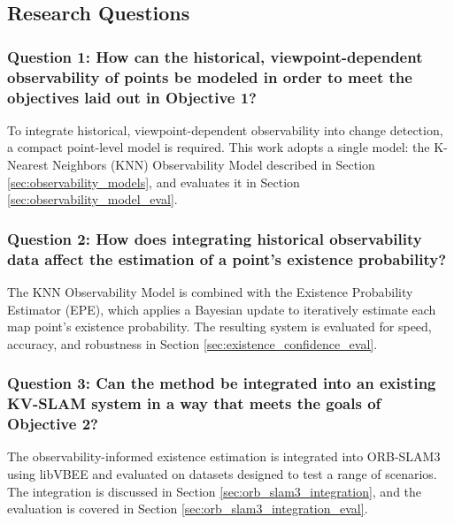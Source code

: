 \subsection{Research Questions}

\subsubsection*{Question 1: How can the historical, viewpoint-dependent observability of points be modeled in order to meet the objectives laid out in Objective 1?}

To integrate historical, viewpoint-dependent observability into change detection, a compact point-level model is required. This work adopts a single model: the K-Nearest Neighbors (KNN) Observability Model described in Section \ref{sec:observability_models}, and evaluates it in Section \ref{sec:observability_model_eval}.

\subsubsection*{Question 2: How does integrating historical observability data affect the estimation of a point's existence probability?}

The KNN Observability Model is combined with the Existence Probability Estimator (EPE), which applies a Bayesian update to iteratively estimate each map point's existence probability. The resulting system is evaluated for speed, accuracy, and robustness in Section \ref{sec:existence_confidence_eval}.

\subsubsection*{Question 3: Can the method be integrated into an existing KV-SLAM system in a way that meets the goals of Objective 2?}

The observability-informed existence estimation is integrated into ORB-SLAM3 using libVBEE and evaluated on datasets designed to test a range of scenarios. The integration is discussed in Section \ref{sec:orb_slam3_integration}, and the evaluation is covered in Section \ref{sec:orb_slam3_integration_eval}.
